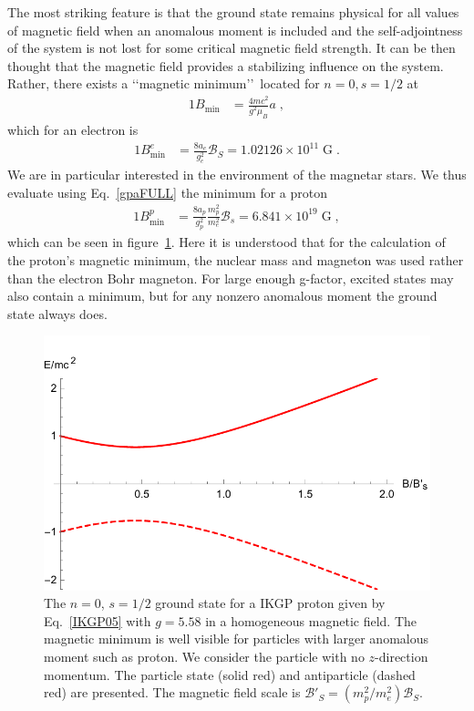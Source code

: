 \documentclass[epj]{svjour}
\begin{document}
The most striking feature is that the ground state remains physical for all values of magnetic field when an anomalous moment is included and the self-adjointness of the system is not lost for some critical magnetic field strength. It can be then thought that the magnetic field provides a stabilizing influence on the system. Rather, there exists a \lq\lq magnetic minimum\rq\rq\ located for $n=0, s=1/2$ at
\begin{alignat}{1}
\label{IKGP06} B_{\mathrm{min}}&=\frac{4mc^{2}}{g^{2}\mu_{B}}a\;,
\end{alignat}
which for an electron is
\begin{alignat}{1}
B_{\mathrm{min}}^{e}&=\frac{8a_e}{g_e^2}\mathcal{B}_S
=1.02126\times10^{11}\;\mathrm{G}\;.
\end{alignat}
We are in particular interested in the environment of the magnetar stars. We thus evaluate using Eq.~\eqref{gpaFULL} the minimum for a proton
\begin{alignat}{1}
B_{\mathrm{min}}^{p}&=\frac{8a_p}{g_p^2} \frac{m_p^2}{m_e^2}\mathcal{B}_s
=6.841\times10^{19}\;\mathrm{G}\;,
\end{alignat}
which can be seen in figure~\ref{f05}. Here it is understood that for the calculation of the proton's magnetic minimum, the nuclear mass and magneton was used rather than the electron Bohr magneton. For large enough g-factor, excited states may also contain a minimum, but for any nonzero anomalous moment the ground state always does.

\begin{figure}
 \centering
 \includegraphics[clip, trim=0.0cm 0.0cm 0.0cm 0.5cm,width=\linewidth]{lanplot09}
 \caption[]{The $n=0$, $s=1/2$ ground state for a IKGP proton given by Eq.~\eqref{IKGP05} with $g=5.58$ in a homogeneous magnetic field. The magnetic minimum is well visible for particles with larger anomalous moment such as proton. We consider the particle with no $z$-direction momentum. The particle state (solid red) and antiparticle (dashed red) are presented. The magnetic field scale is $\mathcal{B}'_{S}=(m^2_p/m^2_e)\mathcal{B}_S$.}
\label{f05}
\end{figure}
\end{document}
